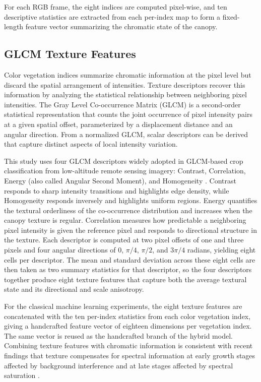 For each RGB frame, the eight indices are computed pixel-wise, and ten descriptive statistics are extracted from each per-index map to form a fixed-length feature vector summarizing the chromatic state of the canopy.

\subsection{GLCM Texture Features}

Color vegetation indices summarize chromatic information at the pixel level but discard the spatial arrangement of intensities. Texture descriptors recover this information by analyzing the statistical relationship between neighboring pixel intensities. The Gray Level Co-occurrence Matrix (GLCM) is a second-order statistical representation that counts the joint occurrence of pixel intensity pairs at a given spatial offset, parameterized by a displacement distance and an angular direction. From a normalized GLCM, scalar descriptors can be derived that capture distinct aspects of local intensity variation.

This study uses four GLCM descriptors widely adopted in GLCM-based crop classification from low-altitude remote sensing imagery: Contrast, Correlation, Energy (also called Angular Second Moment), and Homogeneity \cite{iqbal2021glcmcrop}. Contrast responds to sharp intensity transitions and highlights edge density, while Homogeneity responds inversely and highlights uniform regions. Energy quantifies the textural orderliness of the co-occurrence distribution and increases when the canopy texture is regular. Correlation measures how predictable a neighboring pixel intensity is given the reference pixel and responds to directional structure in the texture. Each descriptor is computed at two pixel offsets of one and three pixels and four angular directions of $0$, $\pi/4$, $\pi/2$, and $3\pi/4$ radians, yielding eight cells per descriptor. The mean and standard deviation across these eight cells are then taken as two summary statistics for that descriptor, so the four descriptors together produce eight texture features that capture both the average textural state and its directional and scale anisotropy.

For the classical machine learning experiments, the eight texture features are concatenated with the ten per-index statistics from each color vegetation index, giving a handcrafted feature vector of eighteen dimensions per vegetation index. The same vector is reused as the handcrafted branch of the hybrid model. Combining texture features with chromatic information is consistent with recent findings that texture compensates for spectral information at early growth stages affected by background interference and at late stages affected by spectral saturation \cite{liu2023glcmrice,ma2022cottonRGB}.

